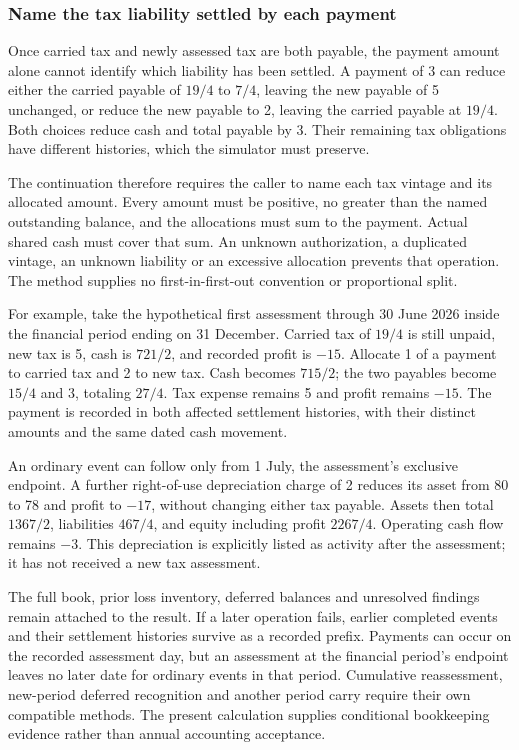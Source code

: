

\subsubsection*{Name the tax liability settled by each payment}
Once carried tax and newly assessed tax are both payable, the payment amount
alone cannot identify which liability has been settled. A payment of 3 can reduce
either the carried payable of $19/4$ to $7/4$, leaving the new payable of 5
unchanged, or reduce the new payable to 2, leaving the carried payable at $19/4$.
Both choices reduce cash and total payable by 3. Their remaining tax obligations
have different histories, which the simulator must preserve.

The continuation therefore requires the caller to name each tax vintage and its
allocated amount. Every amount must be positive, no greater than the named
outstanding balance, and the allocations must sum to the payment. Actual shared
cash must cover that sum. An unknown authorization, a duplicated vintage, an
unknown liability or an excessive allocation prevents that operation. The
method supplies no first-in-first-out convention or proportional split.

For example, take the hypothetical first assessment through 30 June 2026 inside
the financial period ending on 31 December. Carried tax of $19/4$ is still
unpaid, new tax is 5, cash is $721/2$, and recorded profit is $-15$. Allocate 1
of a payment to carried tax and 2 to new tax. Cash becomes $715/2$; the two
payables become $15/4$ and 3, totaling $27/4$. Tax expense remains 5 and profit
remains $-15$. The payment is recorded in both affected settlement histories,
with their distinct amounts and the same dated cash movement.

An ordinary event can follow only from 1 July, the assessment's exclusive
endpoint. A further right-of-use depreciation charge of 2 reduces its asset from
80 to 78 and profit to $-17$, without changing either tax payable. Assets then
total $1367/2$, liabilities $467/4$, and equity including profit $2267/4$.
Operating cash flow remains $-3$. This depreciation is explicitly listed as
activity after the assessment; it has not received a new tax assessment.

The full book, prior loss inventory, deferred balances and unresolved findings
remain attached to the result. If a later operation fails, earlier completed
events and their settlement histories survive as a recorded prefix. Payments
can occur on the recorded assessment day, but an assessment at the financial
period's endpoint leaves no later date for ordinary events in that period.
Cumulative reassessment, new-period deferred recognition and another period
carry require their own compatible methods. The present calculation supplies
conditional bookkeeping evidence rather than annual accounting acceptance.
